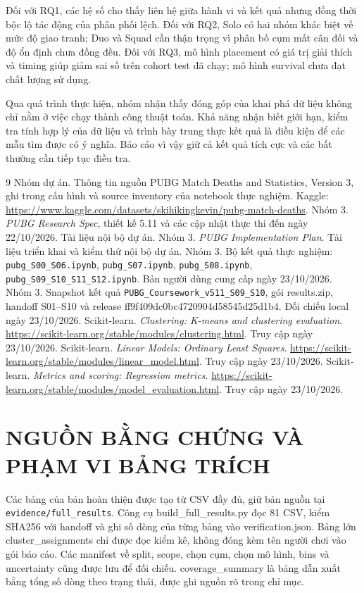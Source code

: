 \documentclass[12pt,a4paper]{article}
\begin{document}
Đối với RQ1, các hệ số cho thấy liên hệ giữa hành vi và kết quả nhưng đồng thời bộc lộ tác động của phân phối lệch. Đối với RQ2, Solo có hai nhóm khác biệt về mức độ giao tranh; Duo và Squad cần thận trọng vì phân bố cụm mất cân đối và độ ổn định chưa đồng đều. Đối với RQ3, mô hình placement có giá trị giải thích và timing giúp giảm sai số trên cohort test đã chạy; mô hình survival chưa đạt chất lượng sử dụng.

Qua quá trình thực hiện, nhóm nhận thấy đóng góp của khai phá dữ liệu không chỉ nằm ở việc chạy thành công thuật toán. Khả năng nhận biết giới hạn, kiểm tra tính hợp lý của dữ liệu và trình bày trung thực kết quả là điều kiện để các mẫu tìm được có ý nghĩa. Báo cáo vì vậy giữ cả kết quả tích cực và các bất thường cần tiếp tục điều tra.
\clearpage\begin{thebibliography}{9}
 Nhóm dự án. Thông tin nguồn PUBG Match Deaths and Statistics, Version 3, ghi trong cấu hình và source inventory của notebook thực nghiệm. Kaggle: \url{https://www.kaggle.com/datasets/skihikingkevin/pubg-match-deaths}.
 Nhóm 3. \textit{PUBG Research Spec}, thiết kế 5.11 và các cập nhật thực thi đến ngày 22/10/2026. Tài liệu nội bộ dự án.
 Nhóm 3. \textit{PUBG Implementation Plan}. Tài liệu triển khai và kiểm thử nội bộ dự án.
 Nhóm 3. Bộ kết quả thực nghiệm: \texttt{pubg\_S00\_S06.ipynb}, \texttt{pubg\_S07.ipynb}, \texttt{pubg\_S08.ipynb}, \texttt{pubg\_S09\_S10\_S11\_S12.ipynb}. Bản người dùng cung cấp ngày 23/10/2026.
 Nhóm 3. Snapshot kết quả \texttt{PUBG\_Coursework\_v511\_S09\_S10}, gói results.zip, handoff S01--S10 và release ff9f409dc0bc4720904d58545d25d1b4. Đối chiếu local ngày 23/10/2026.
 Scikit-learn. \textit{Clustering: K-means and clustering evaluation}. \url{https://scikit-learn.org/stable/modules/clustering.html}. Truy cập ngày 23/10/2026.
 Scikit-learn. \textit{Linear Models: Ordinary Least Squares}. \url{https://scikit-learn.org/stable/modules/linear_model.html}. Truy cập ngày 23/10/2026.
 Scikit-learn. \textit{Metrics and scoring: Regression metrics}. \url{https://scikit-learn.org/stable/modules/model_evaluation.html}. Truy cập ngày 23/10/2026.
\end{thebibliography}
\clearpage\appendix
\section{NGUỒN BẰNG CHỨNG VÀ PHẠM VI BẢNG TRÍCH}
Các bảng của bản hoàn thiện được tạo từ CSV đầy đủ, giữ bản nguồn tại \nolinkurl{evidence/full_results}. Công cụ build\_full\_results.py đọc 81 CSV, kiểm SHA256 với handoff và ghi số dòng của từng bảng vào verification.json. Bảng lớn cluster\_assignments chỉ được đọc kiểm kê, không đóng kèm tên người chơi vào gói báo cáo. Các manifest về split, scope, chọn cụm, chọn mô hình, bins và uncertainty cũng được lưu để đối chiếu. coverage\_summary là bảng dẫn xuất bằng tổng số dòng theo trạng thái, được ghi nguồn rõ trong chỉ mục.
\end{document}
